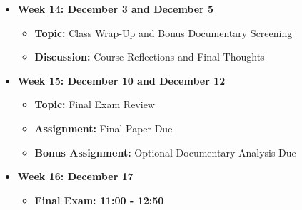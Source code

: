 \documentclass[12pt, letterpaper]{article}
\begin{document}
\begin{itemize}
    \item \textbf{Week 14: December 3 and December 5}
    \begin{itemize}
        \item \textbf{Topic:} Class Wrap-Up and Bonus Documentary Screening 
        \item \textbf{Discussion:} Course Reflections and Final Thoughts
    \end{itemize}

    \item \textbf{Week 15: December 10 and December 12}
    \begin{itemize}
        \item \textbf{Topic:} Final Exam Review
        \item \textbf{Assignment:} Final Paper Due
        \item \textbf{Bonus Assignment:} Optional Documentary Analysis Due
    \end{itemize}

    \item \textbf{Week 16: December 17}
    \begin{itemize}
        \item \textbf{Final Exam: 11:00 - 12:50}
    \end{itemize}
\end{itemize}
\end{document}
